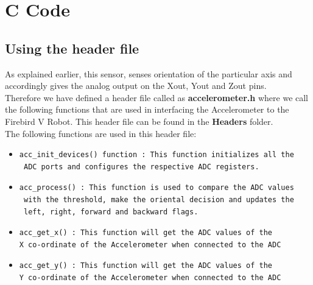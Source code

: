 \documentclass[a4paper,12 pt]{article}
\begin{document}
\section{C Code}
\subsection{Using the header file}
As explained earlier, this sensor, senses orientation of the particular axis and accordingly gives the analog output on the Xout, Yout and Zout pins.\\
Therefore we have defined a header file called as \textbf{accelerometer.h} where we call the following functions that are used in interfacing the Accelerometer to the Firebird V Robot.
This header file can be found in the \textbf{Headers} folder.\\
The following functions are used in this header file:\\

\begin{itemize}
\item \begin{verbatim}
acc_init_devices() function : This function initializes all the
 ADC ports and configures the respective ADC registers.
\end{verbatim}
\end{itemize}

\begin{itemize}
\item	\begin{verbatim}
acc_process() : This function is used to compare the ADC values
 with the threshold, make the oriental decision and updates the
 left, right, forward and backward flags.
\end{verbatim}
\end{itemize}

\begin{itemize}
\item	\begin{verbatim}
acc_get_x() : This function will get the ADC values of the 
X co-ordinate of the Accelerometer when connected to the ADC
\end{verbatim}
\end{itemize}

\begin{itemize}
\item	\begin{verbatim}
acc_get_y() : This function will get the ADC values of the 
Y co-ordinate of the Accelerometer when connected to the ADC
\end{verbatim}
\end{itemize}
\end{document}
